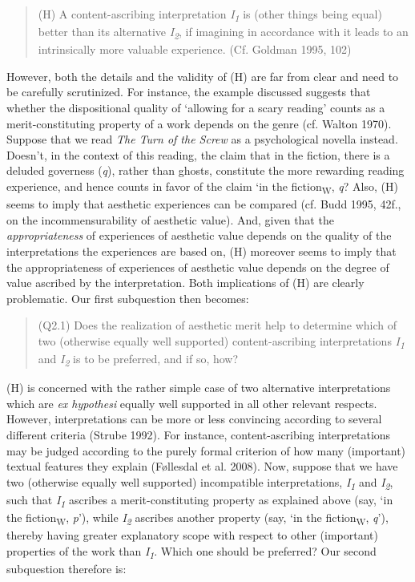 \vspace{-.2cm}
\begin{quote}
(H) A content-ascribing interpretation \emph{I\textsubscript{1}} is (other things being equal) better than its alternative \emph{I\textsubscript{2}}, if imagining in accordance with it leads to an intrinsically more valuable experience. (Cf. Goldman 1995, 102)
\end{quote}
\vspace{-.2cm}

\noindent However, both the details and the validity of (H) are far from clear and need to be carefully scrutinized. For instance, the example discussed suggests that whether the dispositional quality of `allowing for a scary reading' counts as a merit-constituting property of a work depends on the genre (cf. Walton 1970). Suppose that we read \emph{The Turn of the Screw} as a psychological novella instead.{~ }Doesn't, in the context of this reading, the claim that in the fiction, there is a deluded governess (\emph{q}), rather than ghosts, constitute the more rewarding reading experience, and hence counts in favor of the claim `in the fiction\textsubscript{W}, \emph{q}? Also, (H) seems to imply that aesthetic experiences can be compared (cf. Budd 1995, 42f., on the incommensurability of aesthetic value). And, given that the \emph{appropriateness} of experiences of aesthetic value depends on the quality of the interpretations the experiences are based on, (H) moreover seems to imply that the appropriateness of experiences of aesthetic value depends on the degree of value ascribed by the interpretation. Both implications of (H) are clearly problematic. Our first subquestion then becomes:

\vspace{-.2cm}
\begin{quote}
(Q2.1)  Does the realization of aesthetic merit help to determine which of two (otherwise equally well supported) content-ascribing interpretations \emph{I\textsubscript{1}} and \emph{I\textsubscript{2}} is to be preferred, and if so, how?
\end{quote}
\vspace{-.2cm}

\noindent (H) is concerned with the rather simple case of two alternative interpretations which are \emph{ex hypothesi} equally well supported in all other relevant respects. However, interpretations can be more or less convincing according to several different criteria (Strube 1992). For instance, content-ascribing interpretations may be judged according to the purely formal criterion of how many (important) textual features they explain (F\o{}llesdal et al. 2008). Now, suppose that we have two (otherwise equally well supported) incompatible interpretations, \emph{I\textsubscript{1}} and \emph{I\textsubscript{2}}, such that \emph{I\textsubscript{1}} ascribes a merit-constituting property as explained above (say, `in the fiction\textsubscript{W}, \emph{p}'), while \emph{I\textsubscript{2}} ascribes another property (say, `in the fiction\textsubscript{W}, \emph{q}'), thereby having greater explanatory scope with respect to other (important) properties of the work than \emph{I\textsubscript{1}}. Which one should be preferred? Our second subquestion therefore is:

